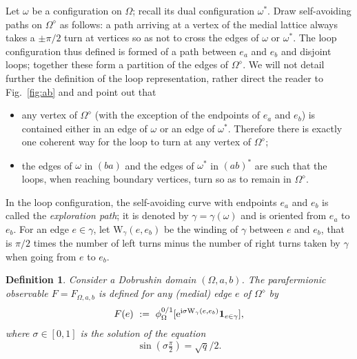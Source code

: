 \documentclass[a4paper,oneside,11pt]{article}
\newtheorem{definition}[theorem]{Definition}
\numberwithin{equation}{section}
\numberwithin{equation}{section}
\numberwithin{equation}{section}
\begin{document}
Let $\omega$ be a configuration on $\Omega$; recall its dual configuration $\omega^*$. 
Draw self-avoiding paths on $\Omega^\diamond$ as follows: a path arriving at a vertex of the medial lattice 
always takes a $\pm \pi/2$ turn at vertices so as not to cross the edges of $\omega$ or $\omega^*$. 
The loop configuration thus defined is formed of a path between $e_a$ and $e_b$ and disjoint loops; 
together these form a partition of the edges of $\Omega^\diamond$. 
We will not detail further the definition of the loop representation, rather direct the reader to Fig.~\ref{fig:ab} and \cite{Dum17a} and point out that
\begin{itemize}
\item any vertex of $\Omega^\diamond$ (with the exception of the endpoints of $e_a$ and $e_b$) is contained either in an edge of $\omega$ or an edge of $\omega^*$.
Therefore there is exactly one coherent way for the loop to turn at any vertex of $\Omega^\diamond$;
\item the edges of $\omega$ in $(ba)$ and the edges of $\omega^*$ in $(ab)^*$ are such that the loops, when reaching boundary vertices, turn so as to remain in $\Omega^\diamond$.
\end{itemize}
In the loop configuration, the self-avoiding curve with endpoints $e_a$ and $e_b$ is called the \emph{exploration path};
it is denoted by $\gamma=\gamma(\omega)$ and is oriented from $e_a$ to $e_b$. 
For an edge $e \in \gamma$, let $\text{W}_{\gamma}(e,e_b)$ be the winding of $\gamma$ between $e$ and $e_b$, 
that is $\pi/2$ times the number of left turns minus the number of right turns taken by $\gamma$ when going from $e$ to $e_b$. 


\begin{definition}\label{def:parafermionic_observable}
    Consider a Dobrushin domain $(\Omega,a,b)$.  
     The {\em parafermionic observable} $F=F_{\Omega,a,b}$  is defined for any (medial) edge $e$ of $\Omega^\diamond$ by
    \begin{equation*}
      F(e) ~:=~\phi^{0/1}_{\Omega}[{\rm e}^{{\rm i}\sigma 
      \text{W}_{\gamma}(e,e_b)} \mathbf1_{e\in \gamma}],
    \end{equation*}
    where $\sigma\in[0,1]$ is the solution of the equation
    \begin{equation}\label{eq:hahaha}
    	\displaystyle  \sin (\sigma \tfrac\pi2) = \sqrt{q}/2.
    \end{equation}
\end{definition}
\end{document}
